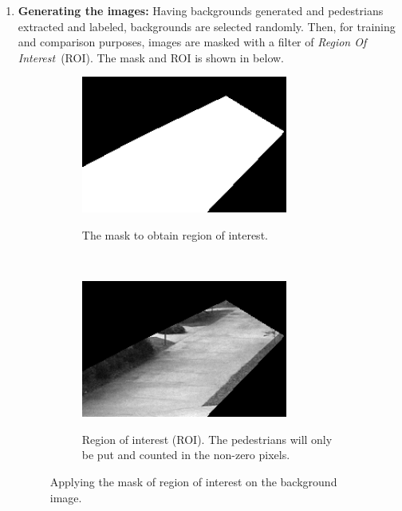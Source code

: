 \begin{enumerate}
\item \textbf{Generating the images:} Having backgrounds generated and pedestrians extracted and labeled, backgrounds are selected randomly. Then, for training and comparison purposes, images are masked with a filter of \textit{Region Of Interest}~(ROI). The mask and ROI is shown in below.

\begin{figure}[h!]
    \centering
    \begin{subfigure}[t]{0.5\textwidth}
        \centering
        {\includegraphics[width=0.8\textwidth]{images/catwalk}}
        \caption{The mask to obtain region of interest.}
    \end{subfigure}%
    ~ 
    \begin{subfigure}[t]{0.5\textwidth}
        \centering
        {\includegraphics[width=0.8\textwidth]{images/roi}}
        \caption{Region of interest (ROI). The pedestrians will only be put and counted in the non-zero pixels.}
    \end{subfigure}
    \caption{Applying the mask of region of interest on the background image.}
    \label{fig:roi}
\end{figure}


\end{enumerate}

